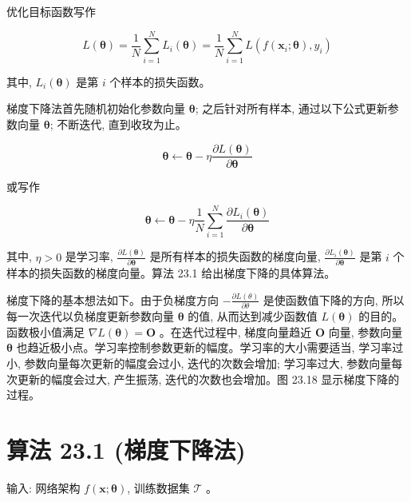 \documentclass[10pt]{article}
\begin{document}
\begin{CJK*}{UTF8}{bsmi}
优化目标函数写作


\begin{equation*}
L(\boldsymbol{\theta})=\frac{1}{N} \sum_{i=1}^{N} L_{i}(\boldsymbol{\theta})=\frac{1}{N} \sum_{i=1}^{N} L\left(f\left(\boldsymbol{x}_{i} ; \boldsymbol{\theta}\right), y_{i}\right) \tag{23.38}
\end{equation*}


其中, $L_{i}(\boldsymbol{\theta})$ 是第 $i$ 个样本的损失函数。

梯度下降法首先随机初始化参数向量 $\boldsymbol{\theta}$; 之后针对所有样本, 通过以下公式更新参数向量 $\boldsymbol{\theta}$; 不断迭代, 直到收玫为止。


\begin{equation*}
\boldsymbol{\theta} \leftarrow \boldsymbol{\theta}-\eta \frac{\partial L(\boldsymbol{\theta})}{\partial \boldsymbol{\theta}} \tag{23.39}
\end{equation*}


或写作


\begin{equation*}
\boldsymbol{\theta} \leftarrow \boldsymbol{\theta}-\eta \frac{1}{N} \sum_{i=1}^{N} \frac{\partial L_{i}(\boldsymbol{\theta})}{\partial \boldsymbol{\theta}} \tag{23.40}
\end{equation*}


其中, $\eta>0$ 是学习率, $\frac{\partial L(\boldsymbol{\theta})}{\partial \boldsymbol{\theta}}$ 是所有样本的损失函数的梯度向量, $\frac{\partial L_{i}(\boldsymbol{\theta})}{\partial \boldsymbol{\theta}}$ 是第 $i$ 个样本的损失函数的梯度向量。算法 23.1 给出梯度下降的具体算法。

梯度下降的基本想法如下。由于负梯度方向 $-\frac{\partial L(\theta)}{\partial \theta}$ 是使函数值下降的方向, 所以每一次迭代以负梯度更新参数向量 $\boldsymbol{\theta}$ 的值, 从而达到减少函数值 $L(\boldsymbol{\theta})$ 的目的。函数极小值满足 $\nabla L(\boldsymbol{\theta})=\boldsymbol{O}$ 。在迭代过程中, 梯度向量趋近 $\boldsymbol{O}$ 向量, 参数向量 $\boldsymbol{\theta}$ 也趋近极小点。学习率控制参数更新的幅度。学习率的大小需要适当, 学习率过小, 参数向量每次更新的幅度会过小, 迭代的次数会增加; 学习率过大, 参数向量每次更新的幅度会过大, 产生振荡, 迭代的次数也会增加。图 23.18 显示梯度下降的过程。

\section*{算法 23.1 (梯度下降法)}
输入: 网络架构 $f(\boldsymbol{x} ; \boldsymbol{\theta})$, 训练数据集 $\mathcal{T}$ 。


\end{CJK*}
\end{document}
